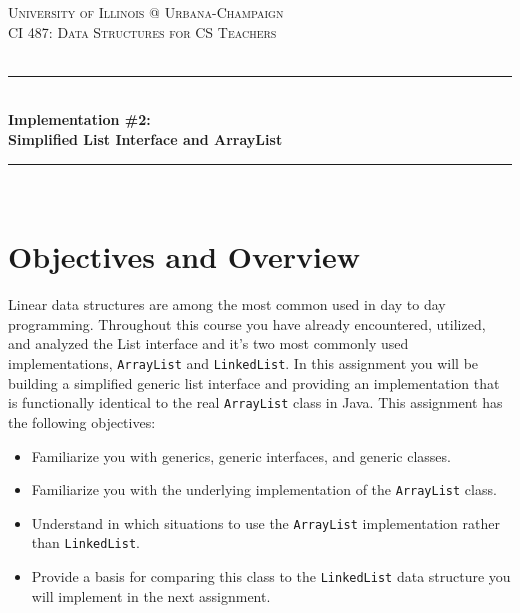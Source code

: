 \documentclass[a4paper]{article}
\begin{document}
\begin{titlepage}

\newcommand{\HRule}{\rule{\linewidth}{0.5mm}} 							%
\center 
 
\textsc{\LARGE University of Illinois @ Urbana-Champaign}\\[1cm]

\textsc{\Large CI 487: Data Structures for CS Teachers}\\[0.2cm]
\textsc{\large }\\[1cm] 										%
\HRule \\[0.8cm]
{ \huge \bfseries Implementation \#2:\\\vspace{0.1cm}Simplified List Interface and ArrayList}\\[0.7cm]								%
\HRule \\[0.8cm]
\vfill 
\end{titlepage}


\section*{Objectives and Overview}

Linear data structures are among the most common used in day to day
programming. Throughout this course you have already encountered, utilized, and
analyzed the List interface and it's two most commonly used implementations,
\lstinline|ArrayList| and \lstinline|LinkedList|. In this assignment you will
be building a simplified generic list interface and providing an implementation
that is functionally identical to the real \lstinline|ArrayList| class in Java.
This assignment has the following objectives:
\begin{itemize}
	\item Familiarize you with generics, generic interfaces, and generic classes.
    \item Familiarize you with the underlying implementation of the \lstinline|ArrayList| class.
    \item Understand in which situations to use the \lstinline|ArrayList| implementation rather than \lstinline|LinkedList|.
    \item Provide a basis for comparing this class to the \lstinline|LinkedList| data structure you will implement in the next assignment.
\end{itemize}
\end{document}
